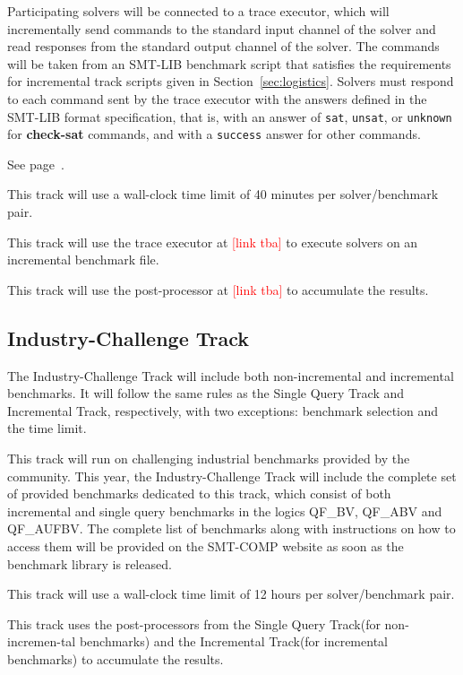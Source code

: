 \documentclass[12pt]{article}
\newcommand{\akey}[1]{\textbf{#1}\xspace}
\newcommand{\rem}[1]{\textcolor{red}{[#1]}}
\newcommand{\maintrack}{Single Query Track\xspace}
\newcommand{\inctrack}{Incremental Track\xspace}
\newcommand{\challtrack}{Industry-Challenge Track\xspace}
\begin{document}
Participating solvers will be connected to a trace executor, which
will incrementally send commands to the standard input channel of the
solver and read responses from the standard output channel of the
solver.  The commands will be taken from an SMT-LIB benchmark script
that satisfies the requirements for incremental track scripts given in
Section~\ref{sec:logistics}.
%
Solvers must respond to each command sent by the trace executor with
the answers defined in the SMT-LIB format specification, that is, with
an answer of \texttt{sat}, \texttt{unsat}, or \texttt{unknown} for
\akey{check-sat} commands, and with a \texttt{success} answer for
other commands.

 See page~\pageref{benchmark-selection}.

This track will use a wall-clock time limit of 40 minutes per solver/benchmark
pair.

 This track will use the trace executor at \rem{link tba}
to execute solvers on an incremental benchmark file.

This track will use the post-processor at \rem{link tba} to accumulate the
results.

\subsection{\challtrack}
\label{sec:exec:industry-challenge}

The \challtrack will include both non-incremental and incremental benchmarks.
It will follow the same rules as the \maintrack and \inctrack, respectively,
with two exceptions: benchmark selection and the time limit.

This track will run on challenging industrial benchmarks provided by the
community. This year, the \challtrack will include the complete set of provided
benchmarks dedicated to this track, which consist of both incremental and
single query benchmarks in the logics QF\_BV, QF\_ABV and QF\_AUFBV. The
complete list of benchmarks along with instructions on how to access them will
be provided on the SMT-COMP website as soon as the benchmark library is
released.

This track will use a wall-clock time limit of 12 hours per solver/benchmark
pair.

This track uses the post-processors from the \maintrack (for non-incremen-tal
benchmarks) and the \inctrack (for incremental benchmarks) to accumulate the
results.
\end{document}
